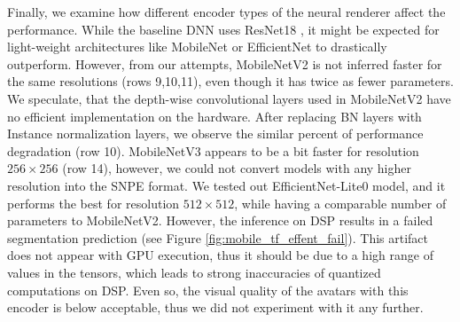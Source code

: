Finally, we examine how different encoder types of the neural renderer affect the performance. While the baseline DNN uses ResNet18 \cite{dnn:resnet16}, it might be expected for light-weight architectures like MobileNet \cite{dnn:mnv2-18,dnn:mnv3-19} or EfficientNet \cite{dnn:efficientnetv1-19} to drastically outperform. However, from our attempts, MobileNetV2 is not inferred faster for the same resolutions (rows 9,10,11), even though it has twice as fewer parameters. We speculate, that the depth-wise convolutional layers used in MobileNetV2 have no efficient implementation on the hardware. After replacing BN layers with Instance normalization layers, we observe the similar percent of performance degradation (row 10). MobileNetV3 \cite{dnn:mnv3-19} appears to be a bit faster for resolution $256 \times 256$ (row 14), however, we could not convert models with any higher resolution into the SNPE format. We tested out EfficientNet-Lite0  model, and it performs the best for resolution $512 \times 512$, while having a comparable number of parameters to MobileNetV2. However, the inference on DSP results in a failed segmentation prediction (see Figure \ref{fig:mobile_tf_effent_fail}). This artifact does not appear with GPU execution, thus it should be due to a high range of values in the tensors, which leads to strong inaccuracies of quantized computations on DSP. Even so, the visual quality of the avatars with this encoder is below acceptable, thus we did not experiment with it any further.
 
